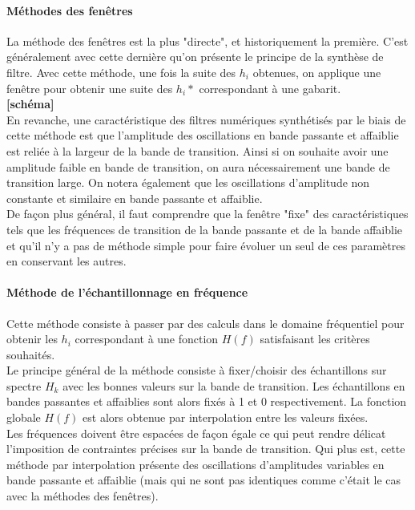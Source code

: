 \documentclass[11pt,a4paper]{article}
\begin{document}
\paragraph{Méthodes des fenêtres} 
La méthode des fenêtres est la plus "directe", et historiquement la première. C'est généralement avec cette dernière  qu'on présente le principe de la synthèse de filtre. Avec cette méthode, une fois la suite des $h_i$ obtenues, on applique une fenêtre pour obtenir une suite des $h_i*$ correspondant à une gabarit.\\

\textbf{[schéma]}\\

En revanche, une caractéristique des filtres numériques synthétisés par le biais de cette méthode est que l'amplitude des oscillations en bande passante et affaiblie est reliée à la largeur de la bande de transition. Ainsi si on souhaite avoir une amplitude faible en bande de transition, on aura nécessairement une bande de transition large. On notera également que les oscillations d'amplitude non constante et similaire en bande passante et affaiblie.\\

De façon plus général, il faut comprendre que la fenêtre "fixe" des caractéristiques tels que les fréquences de transition de la bande passante et de la bande affaiblie et qu'il n'y a pas de méthode simple pour faire évoluer un seul de ces paramètres en conservant les autres.

\paragraph{Méthode de l'échantillonnage en fréquence}
Cette méthode consiste à passer par des calculs dans le domaine fréquentiel pour obtenir les $h_i$ correspondant à une fonction $H(f)$ satisfaisant les critères souhaités.\\

Le principe général de la méthode consiste à fixer/choisir des échantillons sur spectre $H_k$ avec les bonnes valeurs sur la bande de transition. Les échantillons en bandes passantes et affaiblies sont alors fixés à 1 et 0 respectivement. La fonction globale $H(f)$ est alors obtenue par interpolation entre les valeurs fixées.\\

Les fréquences doivent être espacées de façon égale ce qui peut rendre délicat l'imposition de contraintes précises sur la bande de transition. Qui plus est, cette méthode par interpolation présente des oscillations d'amplitudes variables en bande passante et affaiblie (mais qui ne sont pas identiques comme c'était le cas avec la méthodes des fenêtres).\\
\end{document}

